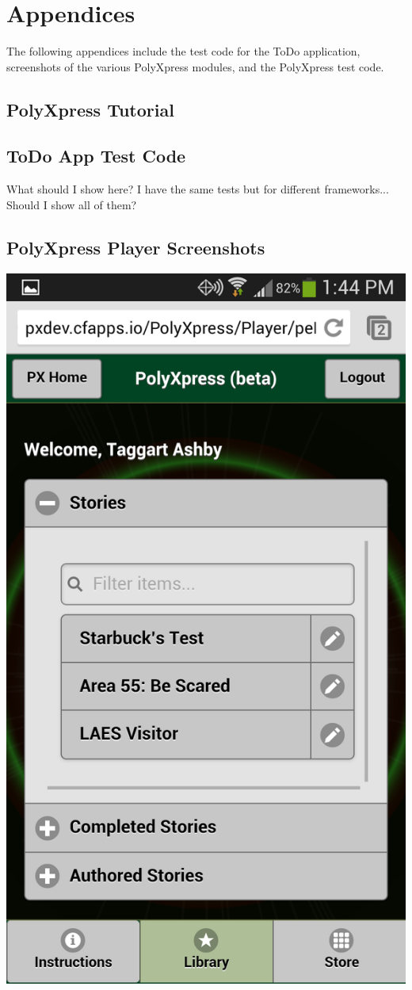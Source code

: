 \documentclass[12pt]{ucthesis}
\newenvironment{Figure}
  {\par\medskip\noindent\minipage{\linewidth}}
  {\endminipage\par\medskip}
\begin{document}
\chapter{Appendices}
The following appendices include the test code for the ToDo application, screenshots of the various PolyXpress modules, and the PolyXpress test code.

\section{PolyXpress Tutorial}

\section{ToDo App Test Code}

What should I show here? I have the same tests but for different frameworks... Should I show all of them?

\section{PolyXpress Player Screenshots}
\begin{Figure}
  \centering
  \includegraphics[width=0.30\linewidth]{px_stories.png}
  

\end{Figure}
\end{document}
